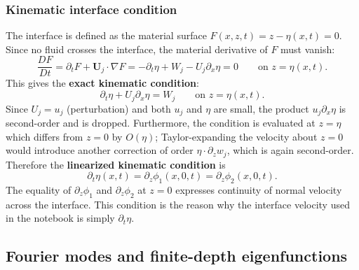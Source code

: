 \documentclass[11pt,a4paper]{article}
\begin{document}
\subsubsection{Kinematic interface condition}

The interface is defined as the material surface $F(x,z,t)=z-\eta(x,t)=0$.  Since no fluid crosses the interface, the material derivative of $F$ must vanish:
\begin{equation}
    \frac{DF}{Dt}
    =
    \partial_t F + \bm{U}_j\cdot\nabla F
    =
    -\partial_t\eta + W_j - U_j\partial_x\eta
    =
    0
    \qquad \text{on } z=\eta(x,t).
\end{equation}
This gives the \textbf{exact kinematic condition}:
\begin{equation}
    \partial_t\eta + U_j\partial_x\eta = W_j
    \qquad \text{on } z=\eta(x,t).
    \label{eq:exact_kinematic}
\end{equation}
Since $U_j = u_j$ (perturbation) and both $u_j$ and $\eta$ are small, the product $u_j\partial_x\eta$ is second-order and is dropped.  Furthermore, the condition is evaluated at $z=\eta$ which differs from $z=0$ by $O(\eta)$; Taylor-expanding the velocity about $z=0$ would introduce another correction of order $\eta\cdot\partial_z w_j$, which is again second-order.  Therefore the \textbf{linearized kinematic condition} is
\begin{equation}
    \boxed{
    \partial_t\eta(x,t)=\partial_z\phi_1(x,0,t)
    =
    \partial_z\phi_2(x,0,t).
    }
    \label{eq:linear_kinematic_condition}
\end{equation}
The equality of $\partial_z\phi_1$ and $\partial_z\phi_2$ at $z=0$ expresses continuity of normal velocity across the interface.  This condition is the reason why the interface velocity used in the notebook is simply $\partial_t\eta$.

\subsection{Fourier modes and finite-depth eigenfunctions}
\end{document}
